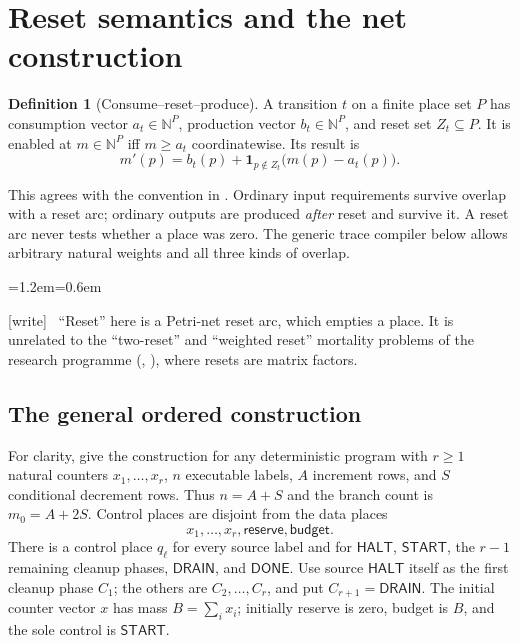 \documentclass[11pt,letterpaper]{article}
\theoremstyle{definition}
\newtheorem{definition}[theorem]{Definition}
\theoremstyle{remark}
\newcommand{\N}{\mathbb N}
\newcommand{\HALT}{\mathsf{HALT}}
\newcommand{\DONE}{\mathsf{DONE}}
\newcommand{\START}{\mathsf{START}}
\newcommand{\res}{\mathsf{reserve}}
\newcommand{\bud}{\mathsf{budget}}
\newcommand{\rnind}{\mathbf 1}
\newcommand{\wtag}{\textup{[write]}}
\newenvironment{writenote}{\par\smallskip\begin{list}{}{\leftmargin=1.2em\rightmargin=0.6em}\item[]\small\wtag\ }{\end{list}\smallskip}
\begin{document}
\section{Reset semantics and the net construction}
\label{qoc:rn:sec:net}
\begin{definition}[Consume--reset--produce]
A transition $t$ on a finite place set $P$ has consumption vector $a_t\in\N^P$, production vector $b_t\in\N^P$, and reset set $Z_t\subseteq P$. It is enabled at $m\in\N^P$ iff $m\geq a_t$ coordinatewise. Its result is
\begin{equation}
 m'(p)=b_t(p)+\rnind_{p\notin Z_t}\bigl(m(p)-a_t(p)\bigr).
 \label{qoc:rn:eq:reset}
\end{equation}
\end{definition}
This agrees with the convention in \cite[Section 2.2]{rn:bfhmo}. Ordinary input requirements survive overlap with a reset arc; ordinary outputs are produced \emph{after} reset and survive it. A reset arc never tests whether a place was zero. The generic trace compiler below allows arbitrary natural weights and all three kinds of overlap.

\begin{writenote}
``Reset'' here is a Petri-net reset arc, which empties a place. It is unrelated to the ``two-reset'' and ``weighted reset'' mortality problems of the research programme (, ), where resets are matrix factors.
\end{writenote}


\subsection{The general ordered construction}
For clarity, give the construction for any deterministic program with $r\geq1$ natural counters $x_1,\ldots,x_r$, $n$ executable labels, $A$ increment rows, and $S$ conditional decrement rows. Thus $n=A+S$ and the branch count is $m_0=A+2S$. Control places are disjoint from the data places
\[
 x_1,\ldots,x_r,\res,\bud.
\]
There is a control place $q_\ell$ for every source label and for $\HALT$, $\START$, the $r-1$ remaining cleanup phases, $\mathsf{DRAIN}$, and $\DONE$. Use source $\HALT$ itself as the first cleanup phase $C_1$; the others are $C_2,\ldots,C_r$, and put $C_{r+1}=\mathsf{DRAIN}$. The initial counter vector $x$ has mass $B=\sum_i x_i$; initially reserve is zero, budget is $B$, and the sole control is $\START$.
\end{document}

